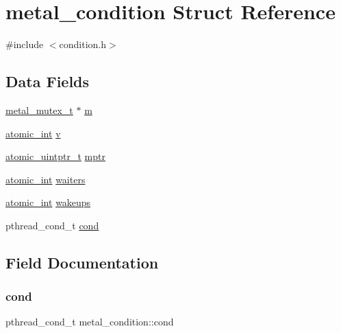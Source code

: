 \hypertarget{structmetal__condition}{}\section{metal\+\_\+condition Struct Reference}
\label{structmetal__condition}


{\ttfamily \#include $<$condition.\+h$>$}

\subsection*{Data Fields}
\begin{DoxyCompactItemize}
\item 
\hyperlink{structmetal__mutex__t}{metal\+\_\+mutex\+\_\+t} $\ast$ \hyperlink{structmetal__condition_a424d948a9bebdc54fd34b3b89d667140}{m}
\item 
\hyperlink{compiler_2gcc_2atomic_8h_a3584358b6d722cb0cca04ac3cfd8a674}{atomic\+\_\+int} \hyperlink{structmetal__condition_a18f14ef5fa6b870c55112dc661f08887}{v}
\item 
\hyperlink{compiler_2gcc_2atomic_8h_aaa955a590bd7e8ef3f098f914978c8f6}{atomic\+\_\+uintptr\+\_\+t} \hyperlink{structmetal__condition_af8373265030f4b57ea2670797ff0adad}{mptr}
\item 
\hyperlink{compiler_2gcc_2atomic_8h_a3584358b6d722cb0cca04ac3cfd8a674}{atomic\+\_\+int} \hyperlink{structmetal__condition_a518ab57574502db086f2c5e344d20770}{waiters}
\item 
\hyperlink{compiler_2gcc_2atomic_8h_a3584358b6d722cb0cca04ac3cfd8a674}{atomic\+\_\+int} \hyperlink{structmetal__condition_a0d86a2776c2ed87e610c15fe9395b0a9}{wakeups}
\item 
pthread\+\_\+cond\+\_\+t \hyperlink{structmetal__condition_aeb36c11bc675cf940b9d027ccc7a214b}{cond}
\end{DoxyCompactItemize}


\subsection{Field Documentation}
\mbox{\label{structmetal__condition_aeb36c11bc675cf940b9d027ccc7a214b}} 
\subsubsection{\texorpdfstring{cond}{cond}}
{\footnotesize\ttfamily pthread\+\_\+cond\+\_\+t metal\+\_\+condition\+::cond}

